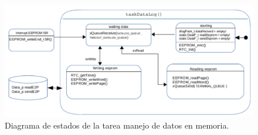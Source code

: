 \begin{figure}[]
	\hspace{-1.5cm}
	\includegraphics[width=1.2\textwidth]{Figures/Cap_3/diagrama_tarea_datalog}
	\caption{Diagrama de estados de la tarea manejo de datos en memoria.}
	\label{fig:diag_TareasLogs}
\end{figure}





